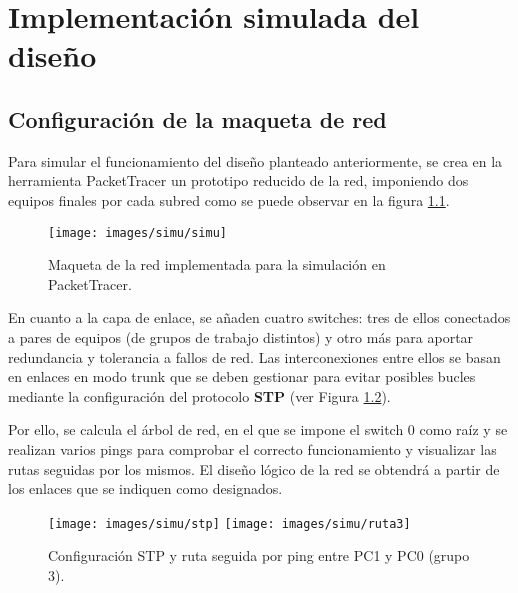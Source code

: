 \chapter{Implementación simulada del diseño }
\label{section:simu}


\section{Configuración de la maqueta de red }

Para simular el funcionamiento del diseño planteado anteriormente, se crea en la herramienta PacketTracer un prototipo reducido de la red, imponiendo dos equipos finales por cada subred como se puede observar en la figura \ref{fig:maqueta}.

    \begin{figure}[h]
    	\centering
    	\texttt{[image: images/simu/simu]}
    	\caption{Maqueta de la red implementada para la simulación en PacketTracer.}
    	\label{fig:maqueta}
    \end{figure}
    
\vspace{2mm}

En cuanto a la capa de enlace, se añaden cuatro switches: tres de ellos conectados a pares de equipos (de grupos de trabajo distintos) y otro más para aportar redundancia y tolerancia a fallos de red. Las interconexiones entre ellos se basan en enlaces en modo trunk que se deben gestionar para evitar posibles bucles mediante la configuración del protocolo \textbf{STP} (ver Figura \ref{fig:stp}). 

\vspace{1mm}

Por ello, se calcula el árbol de red, en el que se impone el switch 0 como raíz y se realizan varios pings para comprobar el correcto funcionamiento y visualizar las rutas seguidas por los mismos. El diseño lógico de la red se obtendrá a partir de los enlaces que se indiquen como designados.

\pagebreak

    \begin{figure}[h]
    \centering
    	\texttt{[image: images/simu/stp]}
        \texttt{[image: images/simu/ruta3]}
    	\caption{Configuración STP y ruta seguida por ping entre PC1 y PC0 (grupo 3).}
    	\label{fig:stp}
    \end{figure}
    
\vspace{1mm}
  
